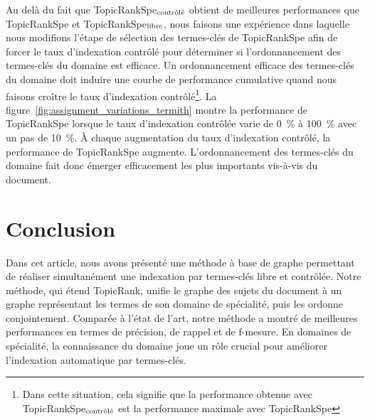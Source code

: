   Au delà du fait que TopicRankSpe$_\textnormal{contrôlé}$ obtient de
  meilleures performances que TopicRankSpe et
  TopicRankSpe$_\textnormal{libre}$, nous faisons une expérience dans
  laquelle nous modifions l'étape de sélection des termes-clés de TopicRankSpe
  afin de forcer le taux d'indexation contrôlé pour déterminer si
  l'ordonnancement des termes-clés du domaine est efficace.
  Un ordonnancement efficace des termes-clés du domaine doit induire une
  courbe de performance cumulative quand nous faisons croître le taux
  d'indexation contrôlé\footnote{Dans cette situation, cela signifie que la
  performance obtenue avec TopicRankSpe$_\textnormal{contrôlé}$ est la
  performance maximale avec TopicRankSpe}.
  La figure~\ref{fig:assignment_variations_termith} montre la performance de
  TopicRankSpe lorsque le taux d'indexation contrôlée varie de 0~\% à 100~\% avec un
  pas de 10~\%. À chaque augmentation du taux d'indexation contrôlé, la
  performance de TopicRankSpe augmente. L'ordonnancement des termes-clés du
  domaine fait donc émerger efficacement les plus
  importants vis-à-vis du document.
  


\section{Conclusion}
\label{sec:main-domain_specific_keyphrase_annotation-conclusion}
  Dans cet article, nous avons présenté une méthode à base de graphe permettant
  de réaliser simultanément une indexation par termes-clés libre et contrôlée.
  Notre méthode, qui étend TopicRank, unifie le graphe des sujets du document à
  un graphe représentant les termes de son domaine de spécialité, puis les
  ordonne conjointement. Comparée à l'état de l'art, notre méthode a montré de
  meilleures performances en termes de précision, de rappel et de f-mesure. En
  domaines de spécialité, la connaissance du domaine joue un rôle crucial pour
  améliorer l'indexation automatique par termes-clés.

